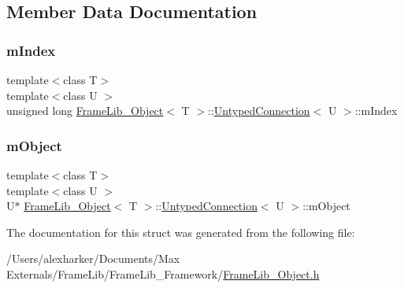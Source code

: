 \subsection{Member Data Documentation}
\mbox{\label{struct_frame_lib___object_1_1_untyped_connection_aec4b0807a42ae5bb1c936861dea4d02e}} 
\subsubsection{\texorpdfstring{m\+Index}{mIndex}}
{\footnotesize\ttfamily template$<$class T$>$ \\
template$<$class U $>$ \\
unsigned long \hyperlink{class_frame_lib___object}{Frame\+Lib\+\_\+\+Object}$<$ T $>$\+::\hyperlink{struct_frame_lib___object_1_1_untyped_connection}{Untyped\+Connection}$<$ U $>$\+::m\+Index}

\mbox{\label{struct_frame_lib___object_1_1_untyped_connection_ad7e6dbcc1873cedfe4a2a0a87cd1bffc}} 
\subsubsection{\texorpdfstring{m\+Object}{mObject}}
{\footnotesize\ttfamily template$<$class T$>$ \\
template$<$class U $>$ \\
U$\ast$ \hyperlink{class_frame_lib___object}{Frame\+Lib\+\_\+\+Object}$<$ T $>$\+::\hyperlink{struct_frame_lib___object_1_1_untyped_connection}{Untyped\+Connection}$<$ U $>$\+::m\+Object}



The documentation for this struct was generated from the following file\+:\begin{DoxyCompactItemize}
\item 
/\+Users/alexharker/\+Documents/\+Max Externals/\+Frame\+Lib/\+Frame\+Lib\+\_\+\+Framework/\hyperlink{_frame_lib___object_8h}{Frame\+Lib\+\_\+\+Object.\+h}\end{DoxyCompactItemize}
